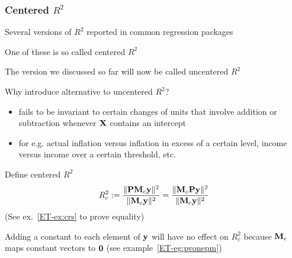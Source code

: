 \begin{frame}\frametitle{Centered $R^{2}$}

    \vspace{2em}
    Several versions of
    $R^2$ reported in common regression packages
    
    One of these is so called
    centered $R^2$
    
    \vspace{.7em}
    The version we discussed so far will now be called
    uncentered $R^2$
    
    Why introduce alternative to uncentered $R^2$? 
    \begin{itemize}
        \item fails to be invariant to certain changes of units that involve
                addition or subtraction whenever
                $\mathbf X$ contains an intercept
        \item for e.g. actual inflation versus inflation in excess of a
                certain level, income versus income over a certain threshold, etc.
    \end{itemize}


\end{frame}

\begin{frame}

    \vspace{2em}
    Define centered
    $R^2$ 
    \begin{equation*}
        \label{eq:crs}
         R_c^2 
         := \frac{\| \mathbf P \mathbf M_c {\mathbf y} \|^2}{\| \mathbf M_c {\mathbf y} \|^2}
         = \frac{\|  \mathbf M_c \mathbf P {\mathbf y} \|^2}{\| \mathbf M_c {\mathbf y} \|^2}
    \end{equation*}
    (See ex.~\ref{ET-ex:crs} to prove equality)
    
    \vspace{.7em}
    Adding a constant to each element
    of ${\mathbf y}$ will have no effect on $R^2_c$ because $\mathbf M_c$ maps constant
    vectors to ${\mathbf 0}$ (see example~\ref{ET-eg:pvonepm})
    
\end{frame}

